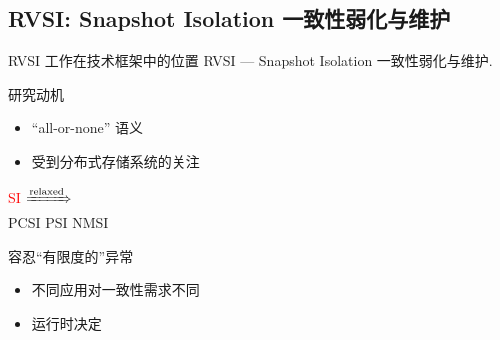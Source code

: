 \subsection{RVSI: Snapshot Isolation 一致性弱化与维护}

\newcommand{\chameleon}{$\textsc{Chameleon}^{\textsc{\scriptsize TKVS}}$}
\newcommand{\konebv}{$k_1$-BV}
\newcommand{\ktwofv}{$k_2$-FV}
\newcommand{\kthreesv}{$k_3$-SV}
\newcommand{\mpord}[1]{\mathcal{O}_{#1}}
\newcommand{\tsts}[1]{#1.{sts}}
\newcommand{\tcts}[1]{#1.{cts}}
\begin{frame}{RVSI 工作在技术框架中的位置}
	{RVSI --- Snapshot Isolation 一致性弱化与维护.}
\end{frame}
\begin{frame}{研究动机}
  \vspace{0.15cm}

  \begin{description}
    \setlength{\itemsep}{5pt}
    \item[分布式事务:]
      \begin{itemize}
        \item ``all-or-none'' 语义
		\item 受到分布式存储系统的关注 \href{https://issues.apache.org/jira/browse/CASSANDRA-7056}{}
      \end{itemize}
	\item[弱一致性:] \textcolor{red}{SI}  \textcolor{red}{$\xRightarrow{\text{relaxed}}$}\\
        PCSI  PSI  NMSI  
    \pause
	\vspace{0.30cm}
	\item[\textcolor{red}{异常控制:}] 容忍``有限度的''异常 
	\item[\textcolor{red}{可调节:}] 
      \begin{itemize}
        \item 不同应用对一致性需求不同 
        \item 运行时决定 
      \end{itemize}
  \end{description}
\end{frame}
